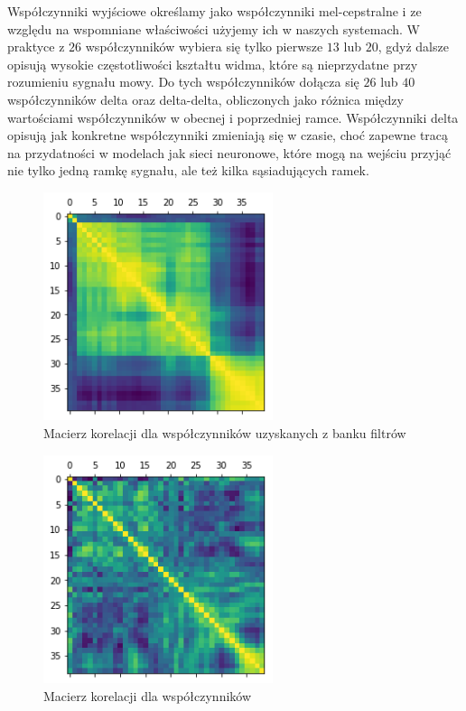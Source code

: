 Współczynniki wyjściowe  określamy jako współczynniki mel-cepstralne i ze względu na
wspomniane właściwości użyjemy ich
w naszych systemach. W praktyce z $26$ współczynników wybiera się tylko pierwsze $13$ lub $20$, gdyż dalsze opisują
wysokie częstotliwości kształtu widma, które są nieprzydatne przy rozumieniu sygnału mowy.
Do tych współczynników dołącza się $26$ lub $40$
współczynników delta oraz delta-delta, obliczonych jako różnica między wartościami współczynników w obecnej i poprzedniej
ramce. Współczynniki delta opisują jak konkretne współczynniki zmieniają się w czasie,
choć zapewne tracą na przydatności w modelach jak sieci neuronowe, które mogą na wejściu przyjąć nie tylko jedną ramkę sygnału,
ale też kilka sąsiadujących ramek.

\begin{figure}[H]
    \centering
    \includegraphics[width=0.6\textwidth]{images/2_1_f_correlation_matrix_banks}
    \caption{Macierz korelacji dla współczynników uzyskanych z banku filtrów}
    \label{fig:2_1_f_correlation_matrix_banks}
\end{figure}

\begin{figure}[H]
    \centering
    \includegraphics[width=0.6\textwidth]{images/2_1_g_correlation_matrix_mfcc}
    \caption{Macierz korelacji dla współczynników }
    \label{fig:2_1_g_correlation_matrix_mfcc}
\end{figure}

